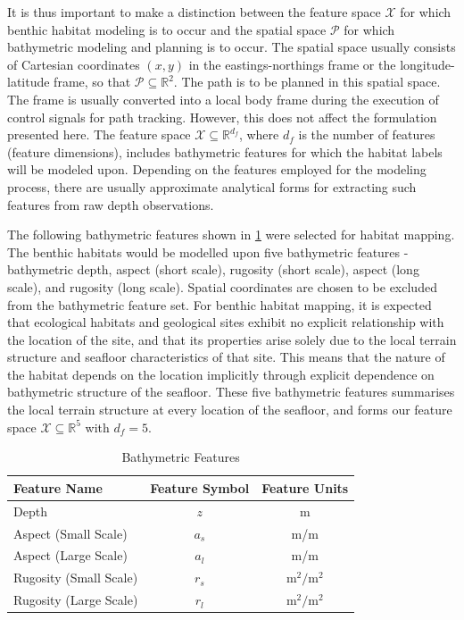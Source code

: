 		It is thus important to make a distinction between the feature space $\mathcal{X}$ for which benthic habitat modeling is to occur and the spatial space $\mathcal{P}$ for which bathymetric modeling and planning is to occur. The spatial space usually consists of Cartesian coordinates $(x, y)$ in the eastings-northings frame or the longitude-latitude frame, so that $\mathcal{P} \subseteq \mathbb{R}^{2}$. The path is to be planned in this spatial space. The frame is usually converted into a local body frame during the execution of control signals for path tracking. However, this does not affect the formulation presented here. The feature space $\mathcal{X} \subseteq \mathbb{R}^{d_{f}}$, where $d_{f}$ is the number of features (feature dimensions), includes bathymetric features for which the habitat labels will be modeled upon. Depending on the features employed for the modeling process, there are usually approximate analytical forms for extracting such features from raw depth observations.
		
		The following bathymetric features shown in \cref{Table:BathymetricFeatures} were selected for habitat mapping. The benthic habitats would be modelled upon five bathymetric features - bathymetric depth, aspect (short scale), rugosity (short scale), aspect (long scale), and rugosity (long scale). Spatial coordinates are chosen to be excluded from the bathymetric feature set. For benthic habitat mapping, it is expected that ecological habitats and geological sites exhibit no explicit relationship with the location of the site, and that its properties arise solely due to the local terrain structure and seafloor characteristics  of that site. This means that the nature of the habitat depends on the location implicitly through explicit dependence on bathymetric structure of the seafloor. These five bathymetric features summarises the local terrain structure at every location of the seafloor, and forms our feature space $\mathcal{X} \subseteq \mathbb{R}^{5}$ with $d_{f} = 5$.
		
		\begin{table}[h]
			\begin{center}
				\begin{tabular}{ l c c }
					\hline
					\hline
					Feature Name & Feature Symbol & Feature Units \\
					\hline
					\hline
					Depth & $z$ & m \\
					Aspect (Small Scale) & $a_{s}$ & m/m \\
					Aspect (Large Scale) & $a_{l}$& m/m \\
					Rugosity (Small Scale) & $r_{s}$ & $\mathrm{m^{2}/m^{2}}$ \\
					Rugosity (Large Scale) & $r_{l}$ & $\mathrm{m^{2}/m^{2}}$  \\
					\hline
					\hline
				\end{tabular}
			\end{center}
	  	\caption{Bathymetric Features}
	  	\label{Table:BathymetricFeatures}			
	  	\end{table}	
		
